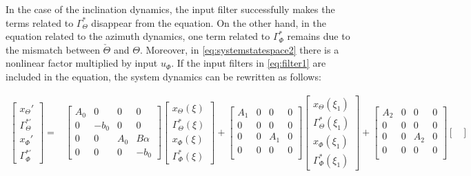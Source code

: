 \documentclass[main.tex]{subfiles}
\begin{document}
	
	In the case of the inclination dynamics, the input filter successfully makes the terms related to $\Gamma_\Theta^*$ disappear from the equation. On the other hand, in the equation related to the azimuth dynamics, one term related to $\Gamma_\Phi^*$ remains due to the mismatch between $\check{\Theta}$ and $\Theta$. Moreover, in \eqref{eq:systemstatespace2} there is a nonlinear factor multiplied by input $u_\Phi$. If the input filters in \eqref{eq:filter1} are included in the equation, the system dynamics can be rewritten as follows:
	
	\begin{align}
	\begin{bmatrix}
	x_\Theta' \\
	\Gamma_\Theta^{*'} \\
	x_\Phi' \\
	\Gamma_\Phi^{*'} 
	\end{bmatrix} =&
	\begin{bmatrix}
	A_0 & 0 & 0 & 0\\
	0 & -b_0 & 0 & 0 \\
	0 & 0 & A_0 & B\alpha \\
	0 & 0 & 0 & -b_0
	\end{bmatrix}
	\begin{bmatrix}
	x_\Theta(\xi) \\
	\Gamma_\Theta^{*}(\xi) \\
	x_\Phi(\xi) \\
	\Gamma_\Phi^{*} (\xi)
	\end{bmatrix} + 
	\begin{bmatrix}
	A_1 & 0 & 0 & 0\\
	0 & 0 & 0 & 0 \\
	0 & 0 & A_1 & 0 \\
	0 & 0 & 0 & 0 \\
	\end{bmatrix}
	\begin{bmatrix}
	x_\Theta(\xi_1) \\
	\Gamma_\Theta^{*}(\xi_1) \\
	x_\Phi(\xi_1) \\
	\Gamma_\Phi^{*} (\xi_1)
	\end{bmatrix} +
	\begin{bmatrix}
	A_2 & 0 & 0 & 0 \\
	0 & 0 & 0 & 0 \\
	0 & 0 & A_2 & 0 \\
	0 & 0 & 0 & 0 \\
	\end{bmatrix}
	\begin{bmatrix}

\end{bmatrix}
\end{align}
\end{document}
